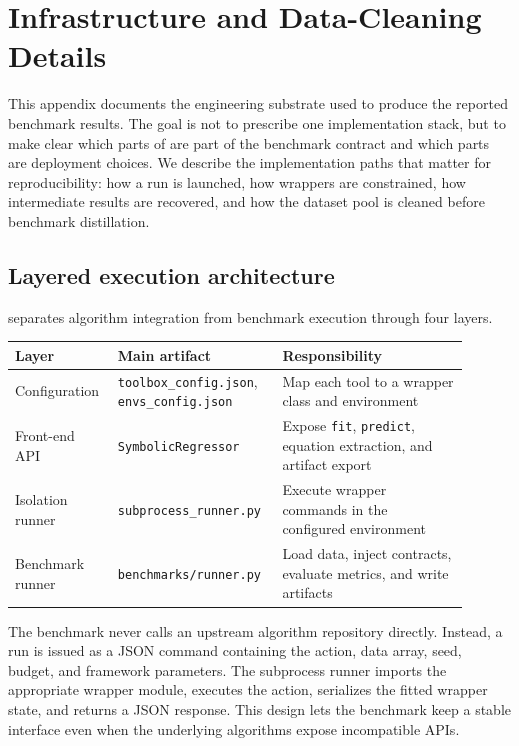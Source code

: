 \section{Infrastructure and Data-Cleaning Details}
\label{app:infra-cleaning}

This appendix documents the engineering substrate used to produce the reported benchmark results. The goal is not to prescribe one implementation stack, but to make clear which parts of \arena{} are part of the benchmark contract and which parts are deployment choices. We describe the implementation paths that matter for reproducibility: how a run is launched, how wrappers are constrained, how intermediate results are recovered, and how the dataset pool is cleaned before benchmark distillation.

\subsection{Layered execution architecture}

\arena{} separates algorithm integration from benchmark execution through four layers.

\begin{center}
\small
\begin{tabular}{p{0.20\linewidth}p{0.31\linewidth}p{0.39\linewidth}}
\toprule
\textbf{Layer} & \textbf{Main artifact} & \textbf{Responsibility} \\
\midrule
Configuration & \texttt{toolbox\_config.json}, \texttt{envs\_config.json} & Map each tool to a wrapper class and environment \\
Front-end API & \texttt{SymbolicRegressor} & Expose \texttt{fit}, \texttt{predict}, equation extraction, and artifact export \\
Isolation runner & \texttt{subprocess\_runner.py} & Execute wrapper commands in the configured environment \\
Benchmark runner & \texttt{benchmarks/runner.py} & Load data, inject contracts, evaluate metrics, and write artifacts \\
\bottomrule
\end{tabular}
\end{center}

The benchmark never calls an upstream algorithm repository directly. Instead, a run is issued as a JSON command containing the action, data array, seed, budget, and framework parameters. The subprocess runner imports the appropriate wrapper module, executes the action, serializes the fitted wrapper state, and returns a JSON response. This design lets the benchmark keep a stable interface even when the underlying algorithms expose incompatible APIs.

